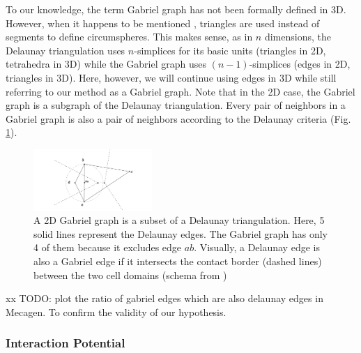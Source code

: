 To our knowledge, the term Gabriel graph has not been formally defined in 3D. However, when it happens to be mentioned \cite{Attali:1997wy}, triangles are used instead of segments to define circumspheres. This makes sense, as in $n$ dimensions, the Delaunay triangulation uses $n$-simplices for its basic units (triangles in 2D, tetrahedra in 3D) while the Gabriel graph uses $(n-1)$-simplices (edges in 2D, triangles in 3D). Here, however, we will continue using edges in 3D while still referring to our method as a Gabriel graph. Note that in the 2D case, the Gabriel graph is a subgraph of the Delaunay triangulation. Every pair of neighbors in a Gabriel graph is also a pair of neighbors according to the Delaunay criteria (Fig. \ref{spatial_neighb_gabdelau}).
\begin{figure}
\begin{center}
\includegraphics[width=0.4\textwidth]{../../images/MECAGEN/spatial_neighb/gabdelau.png}
\end{center}
\caption{A 2D Gabriel graph is a subset of a Delaunay triangulation. Here, 5 solid lines represent the Delaunay edges. The Gabriel graph has only 4 of them because it excludes edge $ab$. Visually, a Delaunay edge is also a Gabriel edge if it intersects the contact border (dashed lines) between the two cell domains (schema from \cite{Cazals:2004wc})}
\label{spatial_neighb_gabdelau}
\end{figure}

xx TODO: plot the ratio of gabriel edges which are also delaunay edges in Mecagen. To confirm the validity of our hypothesis.


\subsubsection{Interaction Potential}


